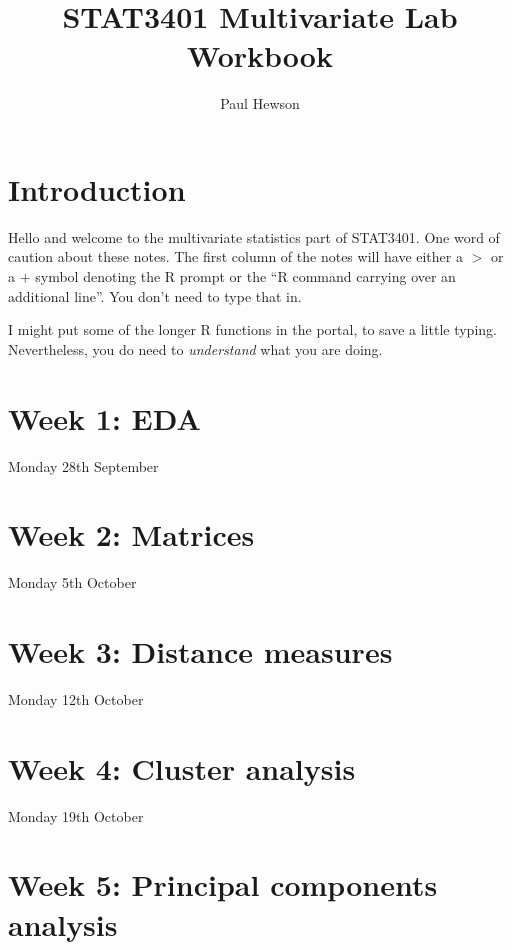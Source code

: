 \documentclass[11pt]{book}
\title{STAT3401 Multivariate Lab Workbook}
\author{Paul Hewson}
\begin{document}
\setlength{\parindent}{0pt}
\setlength{\parskip}{12pt}
\sffamily



\maketitle


\chapter*{Introduction}

Hello and welcome to the multivariate statistics part of STAT3401.   One word of caution about these notes.   The first column of the notes will have either a $>$ or a $+$ symbol denoting the R prompt or the ``R command carrying over an additional line''.   You don't need to type that in.  

I might put some of the longer R functions in the portal, to save a little typing.   Nevertheless, you do need to \emph{understand} what you are doing.


\chapter{Week 1: EDA}

Monday 28th September



\chapter{Week 2: Matrices}

Monday 5th October



\chapter{Week 3: Distance measures}

Monday 12th October



\chapter{Week 4: Cluster analysis}

Monday 19th October



\chapter{Week 5: Principal components analysis}
\end{document}
